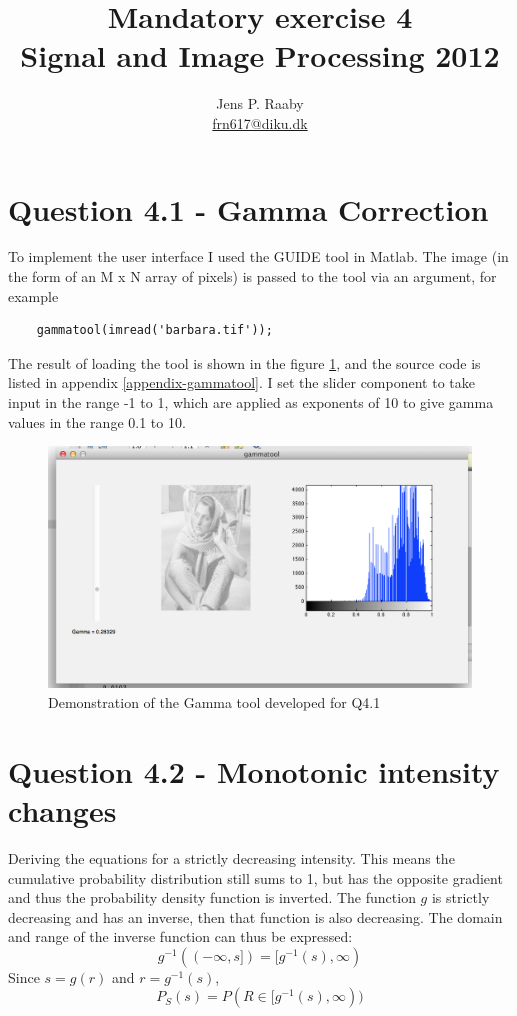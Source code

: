 \documentclass[a4paper]{article}
\title{Mandatory exercise 4 \\
Signal and Image Processing 2012}
\author{Jens P. Raaby \\
\url{frn617@diku.dk}}
\begin{document}
 
\maketitle

\section*{Question 4.1 - Gamma Correction} To implement the user interface I used the GUIDE tool in Matlab. The image (in the form of an M x N array of pixels) is passed to the tool via an argument, for example 
\begin{lstlisting}
	gammatool(imread('barbara.tif')); 
\end{lstlisting}

The result of loading the tool is shown in the figure \ref{q1demo}, and the source code is listed in appendix \ref{appendix-gammatool}. I set the slider component to take input in the range -1 to 1, which are applied as exponents of 10 to give gamma values in the range 0.1 to 10.
\begin{figure}
	\centering 
	\includegraphics[width=0.7
	\textwidth]{gammatool.png} \caption{Demonstration of the Gamma tool developed for Q4.1} \label{q1demo} 
\end{figure}
\section*{Question 4.2 - Monotonic intensity changes} Deriving the equations for a strictly decreasing intensity. 
This means the cumulative probability distribution still sums to 1, but has the opposite gradient and thus the probability density function is inverted. The function $g$ is strictly decreasing and has an inverse, then that function is also decreasing.
The domain and range of the inverse function can thus be expressed:
\begin{equation}
	g^{-1}(( -\infty, s]) = [g^{-1}(s),\infty)    
\end{equation}
Since $s = g(r)$ and $r = g^{-1}(s)$, 
\begin{equation}
    P_S(s) = P(R \in [g^{-1}(s), \infty))
    \label{PrRange}
\end{equation}
\end{document}
